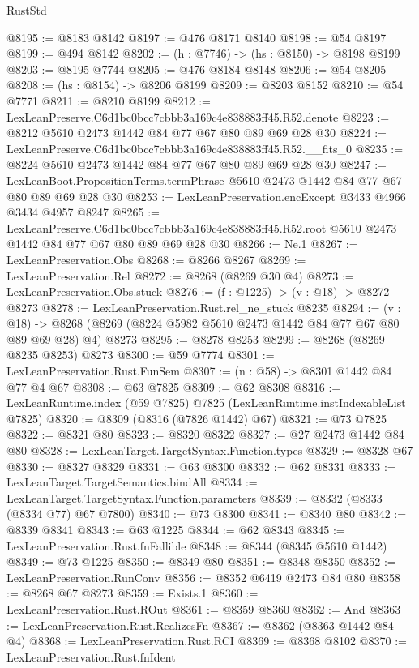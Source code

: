 \begin{lexlean}{RustStd}
\begin{coremodule}
@8195 := @8183 @8142
@8197 := @476 @8171 @8140
@8198 := @54 @8197
@8199 := @494 @8142
@8202 := (h : @7746) -> (hs : @8150) -> @8198 @8199
@8203 := @8195 @7744
@8205 := @476 @8184 @8148
@8206 := @54 @8205
@8208 := (hs : @8154) -> @8206 @8199
@8209 := @8203 @8152
@8210 := @54 @7771
@8211 := @8210 @8199
@8212 := LexLeanPreserve.C6d1bc0bcc7cbbb3a169c4e838883ff45.R52.denote
@8223 := @8212 @5610 @2473 @1442 @84 @77 @67 @80 @89 @69 @28 @30
@8224 := LexLeanPreserve.C6d1bc0bcc7cbbb3a169c4e838883ff45.R52.__fits_0
@8235 := @8224 @5610 @2473 @1442 @84 @77 @67 @80 @89 @69 @28 @30
@8247 := LexLeanBoot.PropositionTerms.termPhrase @5610 @2473 @1442 @84 @77 @67 @80 @89 @69 @28 @30
@8253 := LexLeanPreservation.encExcept @3433 @4966 @3434 @4957 @8247
@8265 := LexLeanPreserve.C6d1bc0bcc7cbbb3a169c4e838883ff45.R52.root
    @5610
    @2473
    @1442
    @84
    @77
    @67
    @80
    @89
    @69
    @28
    @30
@8266 := Ne.{1}
@8267 := LexLeanPreservation.Obs
@8268 := @8266 @8267
@8269 := LexLeanPreservation.Rel
@8272 := @8268 (@8269 @30 @4)
@8273 := LexLeanPreservation.Obs.stuck
@8276 := (f : @1225) -> (v : @18) -> @8272 @8273
@8278 := LexLeanPreservation.Rust.rel_ne_stuck @8235
@8294 := (v : @18) ->
  @8268 (@8269 (@8224 @5982 @5610 @2473 @1442 @84 @77 @67 @80 @89 @69 @28) @4) @8273
@8295 := @8278 @8253
@8299 := @8268 (@8269 @8235 @8253) @8273
@8300 := @59 @7774
@8301 := LexLeanPreservation.Rust.FunSem
@8307 := (n : @58) -> @8301 @1442 @84 @77 @4 @67
@8308 := @63 @7825
@8309 := @62 @8308
@8316 := LexLeanRuntime.index (@59 @7825) @7825 (LexLeanRuntime.instIndexableList @7825)
@8320 := @8309 (@8316 (@7826 @1442) @67)
@8321 := @73 @7825
@8322 := @8321 @80
@8323 := @8320 @8322
@8327 := @27 @2473 @1442 @84 @80
@8328 := LexLeanTarget.TargetSyntax.Function.types
@8329 := @8328 @67
@8330 := @8327 @8329
@8331 := @63 @8300
@8332 := @62 @8331
@8333 := LexLeanTarget.TargetSemantics.bindAll
@8334 := LexLeanTarget.TargetSyntax.Function.parameters
@8339 := @8332 (@8333 (@8334 @77) @67 @7800)
@8340 := @73 @8300
@8341 := @8340 @80
@8342 := @8339 @8341
@8343 := @63 @1225
@8344 := @62 @8343
@8345 := LexLeanPreservation.Rust.fnFallible
@8348 := @8344 (@8345 @5610 @1442)
@8349 := @73 @1225
@8350 := @8349 @80
@8351 := @8348 @8350
@8352 := LexLeanPreservation.RunConv
@8356 := @8352 @6419 @2473 @84 @80
@8358 := @8268 @67 @8273
@8359 := Exists.{1}
@8360 := LexLeanPreservation.Rust.ROut
@8361 := @8359 @8360
@8362 := And
@8363 := LexLeanPreservation.Rust.RealizesFn
@8367 := @8362 (@8363 @1442 @84 @4)
@8368 := LexLeanPreservation.Rust.RCI
@8369 := @8368 @8102
@8370 := LexLeanPreservation.Rust.fnIdent

\end{coremodule}
\end{lexlean}
